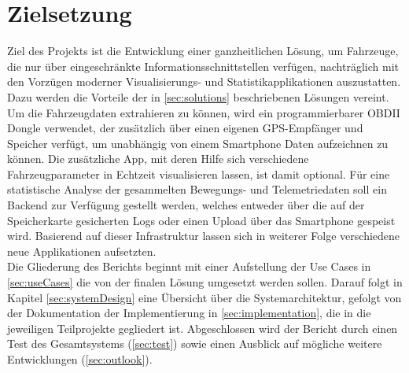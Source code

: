 \section{Zielsetzung}
Ziel des Projekts ist die Entwicklung einer ganzheitlichen Lösung, um Fahrzeuge, die nur über eingeschränkte Informationsschnittstellen verfügen, nachträglich mit den Vorzügen moderner Visualisierungs- und Statistikapplikationen auszustatten. Dazu werden die Vorteile der in \ref{sec:solutions} beschriebenen Lösungen vereint. Um die Fahrzeugdaten extrahieren zu können, wird ein programmierbarer OBDII Dongle verwendet, der zusätzlich über einen eigenen GPS-Empfänger und Speicher verfügt, um unabhängig von einem Smartphone Daten aufzeichnen zu können. Die zusätzliche App, mit deren Hilfe sich verschiedene Fahrzeugparameter in Echtzeit visualisieren lassen, ist damit optional. Für eine statistische Analyse der gesammelten Bewegungs- und Telemetriedaten soll ein Backend zur Verfügung gestellt werden, welches entweder über die auf der Speicherkarte gesicherten Logs oder einen Upload über das Smartphone gespeist wird. Basierend auf dieser Infrastruktur lassen sich in weiterer Folge verschiedene neue Applikationen aufsetzten. \\

Die Gliederung des Berichts beginnt mit einer Aufstellung der Use Cases in \ref{sec:useCases} die von der finalen Lösung umgesetzt werden sollen. Darauf folgt in Kapitel \ref{sec:systemDesign} eine Übersicht über die Systemarchitektur, gefolgt von der Dokumentation der Implementierung in \ref{sec:implementation}, die in die jeweiligen Teilprojekte gegliedert ist. Abgeschlossen wird der Bericht durch einen Test des Gesamtsystems (\ref{sec:test}) sowie einen Ausblick auf mögliche weitere Entwicklungen (\ref{sec:outlook}).






